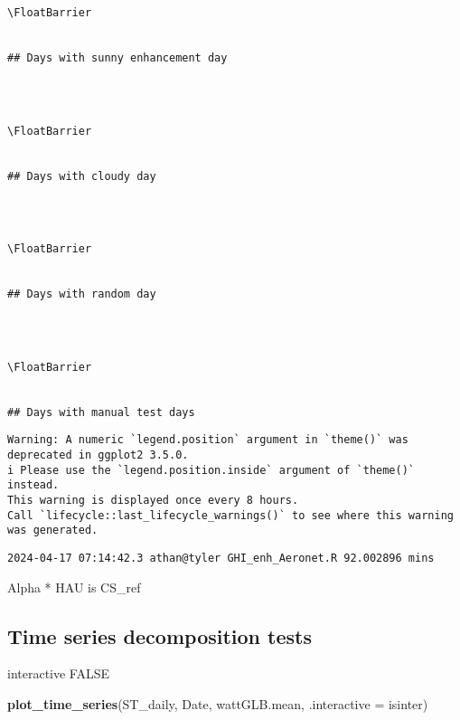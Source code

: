 \documentclass[
  10pt,
  a4paper,oneside]{article}
\newenvironment{Shaded}{\begin{snugshade}}{\end{snugshade}}
\newcommand{\AttributeTok}[1]{\textcolor[rgb]{0.13,0.29,0.53}{#1}}
\newcommand{\FunctionTok}[1]{\textcolor[rgb]{0.13,0.29,0.53}{\textbf{#1}}}
\newcommand{\NormalTok}[1]{#1}
\begin{document}
\begin{verbatim}
 
 

\FloatBarrier


## Days with sunny enhancement day 
\end{verbatim}

\begin{verbatim}
 
 

\FloatBarrier


## Days with cloudy day 
\end{verbatim}

\begin{verbatim}
 
 

\FloatBarrier


## Days with random day 
\end{verbatim}

\begin{verbatim}
 
 

\FloatBarrier


## Days with manual test days 
\end{verbatim}

\begin{verbatim}
Warning: A numeric `legend.position` argument in `theme()` was deprecated in ggplot2 3.5.0.
i Please use the `legend.position.inside` argument of `theme()` instead.
This warning is displayed once every 8 hours.
Call `lifecycle::last_lifecycle_warnings()` to see where this warning was generated.
\end{verbatim}

\begin{verbatim}
2024-04-17 07:14:42.3 athan@tyler GHI_enh_Aeronet.R 92.002896 mins
\end{verbatim}

Alpha * HAU is CS\_ref

\hypertarget{time-series-decomposition-tests}{%
\subsection{Time series decomposition tests}\label{time-series-decomposition-tests}}

interactive FALSE

\begin{Shaded}
\begin{Highlighting}[]
\FunctionTok{plot\_time\_series}\NormalTok{(ST\_daily, Date, wattGLB.mean, }\AttributeTok{.interactive =}\NormalTok{ isinter)}
\end{Highlighting}
\end{Shaded}
\end{document}
